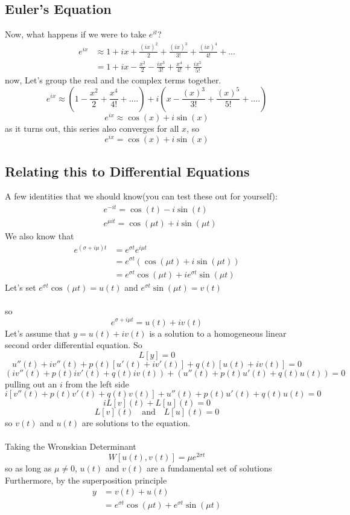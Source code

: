\documentclass[font =22]{report}
\begin{document}
\subsection{Euler's Equation}
Now, what happens if we were to take $e^{it}$?
\begin{align*}
e^{ix} &\approx 1 + ix + \frac{(ix)^2}{2} + \frac{(ix)^3}{3!} +\frac{(ix)^4}{4!}+...\\
&= 1 + ix - \frac{x^2}{2}- \frac{ix^3}{3!}+\frac{x^4}{4!}+\frac{ix^5}{5!}
\end{align*}
now, Let's group the real and the complex terms together.
\[
e^{ix} \approx (1 - \frac{x^2}{2} +\frac{x^4}{4!} +....) + i(x-\frac{(x)^3}{3!}+\frac{(x)^5}{5!}+....)
\]
\[
e^{ix} \approx \cos(x) + i\sin(x)
\]
as it turns out, this series also converges for all $x$, so 
\[
e^{ix} = \cos(x) + i\sin(x)
\]
\subsection{Relating this to Differential Equations}
A few identities that we should know(you can test these out for yourself):
\begin{align*}
&e^{-it} = \cos(t) - i\sin(t)\\
&e^{\mu it}=\cos(\mu t) + i\sin(\mu t)
\end{align*}
We also know that
\begin{align*}
e^{(\sigma + i \mu )t} &= e^{\sigma t}e^{i\mu t}\\
& = e^{\sigma t}(\cos(\mu t) + i\sin(\mu t))\\
&= e^{\sigma t}\cos(\mu t)+ i e^{\sigma t}\sin(\mu t)
\end{align*}
Let's set  $e^{\sigma t}\cos(\mu t) = u(t)$ and $e^{\sigma t}\sin(\mu t) = v(t)$\\\\
so 
\[
e^{\sigma + i \mu t} = u(t) + iv(t)
\]
Let's assume that $y =  u(t) + iv(t)$ is a solution to a homogeneous linear second order differential equation. So 
\[
L[y] = 0
\]
\[
u''(t) + iv''(t) + p(t)[u'(t) + iv'(t)] + q(t)[u(t) + iv(t)] = 0
\]
\[
(iv''(t) + p(t)iv'(t) + q(t) iv(t)) + (u''(t) + p(t)u'(t) + q(t) u(t)) = 0
\]
pulling out an $i$ from the left side 
\[
i[v''(t) + p(t)v'(t) + q(t) v(t)] + u''(t) + p(t)u'(t) + q(t) u(t) = 0
\]
\[
iL[v](t) + L[u](t) = 0
\]
\[
L[v](t) \quad \text{and} \quad L[u](t) = 0
\]
so $v(t)$ and $u(t)$ are solutions to the equation.\\\\
Taking the Wronskian Determinant 
\[
W[u(t), v(t)] = \mu e^{2\sigma t}
\] 
so as long as $\mu \neq 0$, $u(t)$ and $v(t)$ are a fundamental set of solutions
Furthermore, by the superposition principle 
\begin{align*}
y &= v(t) + u(t)\\
&= e^{\sigma t}\cos(\mu t) + e^{\sigma t}\sin(\mu t)
\end{align*}
\end{document}
